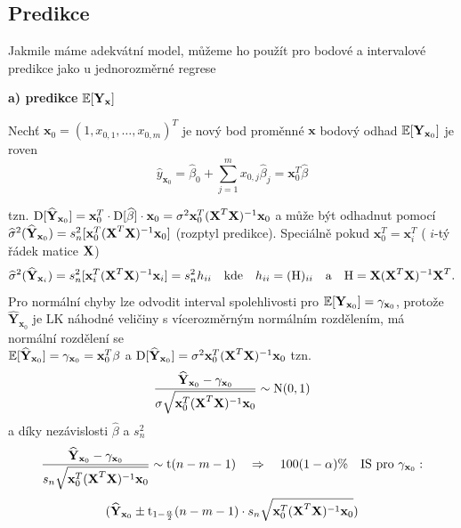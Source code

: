 \subsection{Predikce}
Jakmile máme adekvátní model, můžeme ho použít pro bodové a intervalové predikce jako u jednorozměrné regrese

\textbf{ a) predikce} $ \mathbb{E} [ \textbf{Y}_{\textbf{x}} ] $

Nechť $ \textbf{x}_0 = ( 1, x_{0,1} , \dots , x_{0,m} )^{T} $ je nový bod proměnné $ \textbf{x} $ bodový odhad $ \mathbb{E} [ \textbf{Y}_{\textbf{x}_0} ] $ je roven 
$$
 \widehat{y}_{\textbf{x}_0} = \widehat{\beta}_0 + \sum_{j=1}^{m} x_{0,j} \widehat{\beta}_j = \textbf{x}_0^{T} \widehat{\beta} 
$$

tzn. $ \mathrm{D} [ \widehat{\textbf{Y}}_{\textbf{x}_0} ] = \textbf{x}_0^{T} \cdot \mathrm{D} [ \widehat{\beta} ] \cdot \textbf{x}_0 = \sigma^{2} \textbf{x}_0^{T}( \textbf{X} ^{T} \textbf{X} )^{-1} \textbf{x}_0 $ a může být odhadnut pomocí \\
$
 \widehat{\sigma}^{2}(\widehat{\textbf{Y}}_{\textbf{x}_0}) = s_n^2 [ \textbf{x}_0^{T}( \textbf{X} ^{T} \textbf{X} )^{-1} \textbf{x}_0 ]  $ (rozptyl predikce). Speciálně pokud $ \textbf{x}_0^{T} = \textbf{x}_i^{T} $ ( $ i $-tý řádek matice $ \textbf{X} $)
 $$
  \widehat{\sigma}^{2}(\widehat{\textbf{Y}}_{\textbf{x}_i}) = s_n^2 [ \textbf{x}_i^{T}( \textbf{X} ^{T} \textbf{X} )^{-1} \textbf{x}_i ] = s_n^2 h_{ii} \quad \text{kde} \quad h_{ii} = (\text{H})_{ii} \quad \text{a} \quad \text{H} = \textbf{X} (\textbf{X} ^{T}  \textbf{X} )^{-1} \textbf{X} ^{T}.
 $$
Pro normální chyby lze odvodit interval spolehlivosti pro $ \mathbb{E} [\textbf{Y}_{\textbf{x}_0}] = \gamma_{\textbf{x}_0} $, protože $ \widehat{\textbf{Y}}_{\textbf{x}_0} $ je LK náhodné veličiny s vícerozměrným normálním rozdělením, má normální rozdělení se \\ $ \mathbb{E} [\widehat{\textbf{Y}}_{\textbf{x}_0}] = \gamma_{\textbf{x}_0} = \textbf{x}_0^{T} \beta $ a $ \mathrm{D} [ \widehat{\textbf{Y}}_{\textbf{x}_0} ] = \sigma^{2} \textbf{x}_0^{T}( \textbf{X} ^{T} \textbf{X} )^{-1} \textbf{x}_0 $
tzn.
$$
\frac{\widehat{\textbf{Y}}_{\textbf{x}_0} - \gamma_{\textbf{x}_0}}{\sigma \sqrt{\textbf{x}_0^{T}( \textbf{X} ^{T} \textbf{X} )^{-1} \textbf{x}_0}} \sim \text{N}(0,1) 
$$
a díky nezávislosti $ \widehat{\beta} $ a $ s_n^2 $
$$
 \frac{\widehat{\textbf{Y}}_{\textbf{x}_0} - \gamma_{\textbf{x}_0}}{s_n \sqrt{\textbf{x}_0^{T}( \textbf{X} ^{T} \textbf{X} )^{-1} \textbf{x}_0}} \sim \text{t}(n-m-1) \quad \Rightarrow \quad 100(1 - \alpha) \% \quad \text{IS pro } \gamma_{\textbf{x}_0}:
$$
$$
   ( \widehat{\textbf{Y}}_{\textbf{x}_0} \pm \text{t}_{1-\frac{\alpha}{2}}(n-m-1) \cdot s_n \sqrt{\textbf{x}_0^{T}( \textbf{X} ^{T} \textbf{X} )^{-1} \textbf{x}_0})
$$


